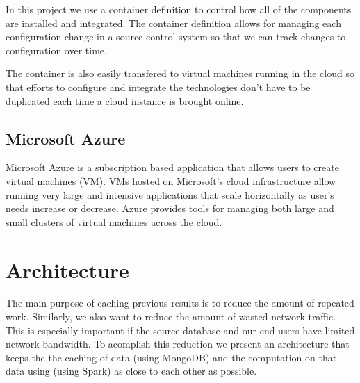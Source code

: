 \documentclass[conference,twoside]{IEEEtran}
\begin{document}
In this project we use a container definition to control how all of the components are installed and integrated. The container definition allows for managing each configuration change in a source control system so that we can track changes to configuration over time.

The container is also easily transfered to virtual machines running in the cloud so that efforts to configure and integrate the technologies don't have to be duplicated each time a cloud instance is brought online.

\subsection{Microsoft Azure}
Microsoft Azure is a subscription based application that allows users to create virtual machines (VM). VMs hosted on Microsoft's cloud infrastructure allow running very large and intensive applications that scale horizontally as user's needs increase or decrease. Azure provides tools for managing both large and small clusters of virtual machines across the cloud\cite{azure}.


\section{Architecture}
The main purpose of caching previous results is to reduce the amount of repeated work. Similarly, we also want to reduce the amount of wasted network traffic. This is especially important if the source database and our end users have limited network bandwidth. To acomplish this reduction we present an architecture that keeps the the caching of data (using MongoDB) and the computation on that data using (using Spark) as close to each other as possible.
\end{document}
